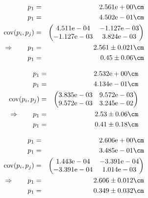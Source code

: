 \begin{eqnarray}
    p_1 &=& 2.561\mathrm{e}+00 \cm \nonumber \\
    p_1 &=& 4.502\mathrm{e}-01 \cm \nonumber \\
    \mathrm{cov}(p_i, p_j) &=& 
    \begin{pmatrix}
        4.511\mathrm{e}-04 &-1.127\mathrm{e}-03 \\
        -1.127\mathrm{e}-03 &3.824\mathrm{e}-03 \\
    \end{pmatrix}
\\ \Rightarrow \qquad
    p_1 &=& 2.561 \pm 0.021 \cm\\
    p_1 &=& 0.45 \pm 0.06 \cm
\end{eqnarray}

\begin{eqnarray}
    p_1 &=& 2.532\mathrm{e}+00 \cm \nonumber \\
    p_1 &=& 4.134\mathrm{e}-01 \cm \nonumber \\
    \mathrm{cov}(p_i, p_j) &=& 
    \begin{pmatrix}
        3.835\mathrm{e}-03 &9.572\mathrm{e}-03 \\
        9.572\mathrm{e}-03 &3.245\mathrm{e}-02 \\
    \end{pmatrix}
\\ \Rightarrow \qquad
    p_1 &=& 2.53 \pm 0.06 \cm\\
    p_1 &=& 0.41 \pm 0.18 \cm
\end{eqnarray}

\begin{eqnarray}
    p_1 &=& 2.606\mathrm{e}+00 \cm \nonumber \\
    p_1 &=& 3.485\mathrm{e}-01 \cm \nonumber \\
    \mathrm{cov}(p_i, p_j) &=& 
    \begin{pmatrix}
        1.443\mathrm{e}-04 &-3.391\mathrm{e}-04 \\
        -3.391\mathrm{e}-04 &1.014\mathrm{e}-03 \\
    \end{pmatrix}
\\ \Rightarrow \qquad
    p_1 &=& 2.606 \pm 0.012 \cm\\
    p_1 &=& 0.349 \pm 0.032 \cm
\end{eqnarray}

